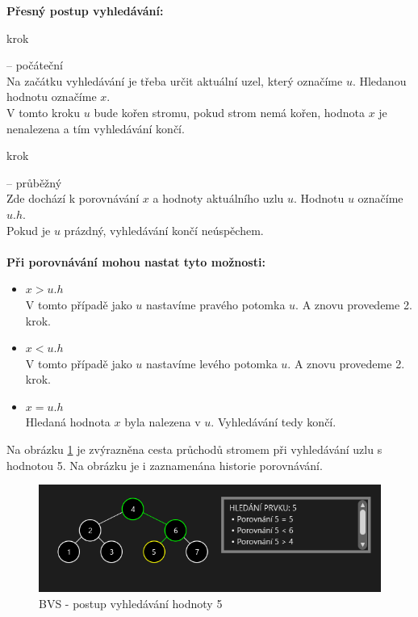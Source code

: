 \documentclass[
  biblatex=false,
  font=serif,
  glossaries=false,
  tables=false,
  theorems=false,
  index
]{kidiplom}
\begin{document}
\noindent \textbf{Přesný postup vyhledávání:}
\begin{enumerate} {\bfseries
\item  krok} -- počáteční \\
Na začátku vyhledávání je třeba určit aktuální uzel, který označíme $u$. Hledanou hodnotu označíme $x$.\\
V tomto kroku $u$ bude kořen stromu, pokud strom nemá kořen, hodnota $x$ je nenalezena a tím vyhledávání končí.
{\bfseries\item  krok} -- průběžný \\
Zde dochází k porovnávání $x$ a hodnoty aktuálního uzlu $u$. Hodnotu $u$ označíme $u.h$.\\
Pokud je $u$ prázdný, vyhledávání končí neúspěchem. \\\\
\textbf{Při porovnávání mohou nastat tyto možnosti:}
\begin{itemize}
\item $x > u.h$ \\
V tomto případě jako $u$ nastavíme pravého potomka $u$. A znovu provedeme 2. krok.
\newpage
\item $x < u.h$\\
V tomto případě jako $u$ nastavíme levého potomka $u$. A znovu provedeme 2. krok.
\item $x = u.h$\\
Hledaná hodnota $x$ byla nalezena v $u$. Vyhledávání tedy končí.
\end{itemize}
\end{enumerate}

\medskip
\noindent Na obrázku \ref{binarySearch} je zvýrazněna cesta průchodů stromem při vyhledávání uzlu s hodnotou 5. Na obrázku je i zaznamenána historie porovnávání.

\begin{figure}[h!]
\centering
	\includegraphics[scale=0.9]{obrazky/5BinarniVyhledavani.png}
	\caption{BVS - postup vyhledávání hodnoty 5}
	\label{binarySearch}
\end{figure}
\end{document}
